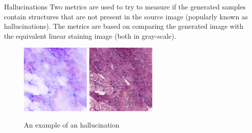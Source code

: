 \documentclass[t]{beamer}
\begin{document}
\begin{frame}{Hallucinations}
Two metrics are used to try to measure if the generated
samples contain structures that are not present in the source image
(popularly known as hallucinations). The metrics are based on comparing
the generated image with the equivalent linear staining image (both in gray-scale).

\begin{figure}
\centering
\includegraphics[width=0.3\textwidth]{epoch246_real_A}\hspace{0.15\textwidth}%
\includegraphics[width=0.3\textwidth]{epoch246_fake_B}
\caption{An example of an hallucination}
\end{figure}

\end{frame}
\end{document}

